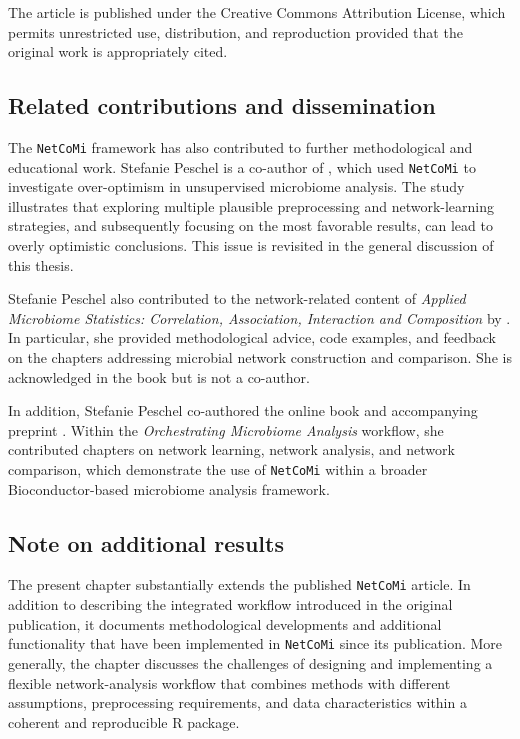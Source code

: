 The article is published under the Creative Commons Attribution License, which permits unrestricted use, distribution, and reproduction provided that the original work is appropriately cited.

\subsection*{Related contributions and dissemination}

The \texttt{NetCoMi} framework has also contributed to further methodological and educational work. Stefanie Peschel is a co-author of \citet{ullmann2023overoptimism}, which used \texttt{NetCoMi} to investigate over-optimism in unsupervised microbiome analysis. The study illustrates that exploring multiple plausible preprocessing and network-learning strategies, and subsequently focusing on the most favorable results, can lead to overly optimistic conclusions. This issue is revisited in the general discussion of this thesis.

Stefanie Peschel also contributed to the network-related content of \textit{Applied Microbiome Statistics: Correlation, Association, Interaction and Composition} by \citet{xia2024applied}. In particular, she provided methodological advice, code examples, and feedback on the chapters addressing microbial network construction and comparison. She is acknowledged in the book but is not a co-author.

In addition, Stefanie Peschel co-authored the online book and accompanying preprint \citet{borman2025orchestrating}. Within the \textit{Orchestrating Microbiome Analysis} workflow, she contributed chapters on network learning, network analysis, and network comparison, which demonstrate the use of \texttt{NetCoMi} within a broader Bioconductor-based microbiome analysis framework.

\subsection*{Note on additional results}

The present chapter substantially extends the published \texttt{NetCoMi} article. In addition to describing the integrated workflow introduced in the original publication, it documents methodological developments and additional functionality that have been implemented in \texttt{NetCoMi} since its publication. More generally, the chapter discusses the challenges of designing and implementing a flexible network-analysis workflow that combines methods with different assumptions, preprocessing requirements, and data characteristics within a coherent and reproducible R package.

